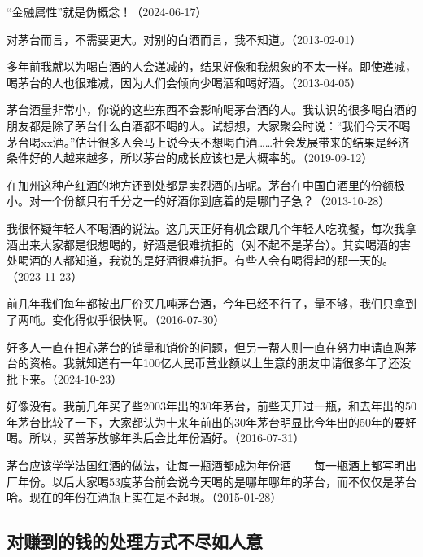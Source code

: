 “金融属性”就是伪概念！（2024-06-17）


对茅台而言，不需要更大。对别的白酒而言，我不知道。（2013-02-01）


多年前我就以为喝白酒的人会递减的，结果好像和我想象的不太一样。即使递减，喝茅台的人也很难减，因为人们会倾向少喝酒和喝好酒。（2013-04-05）

茅台酒量非常小，你说的这些东西不会影响喝茅台酒的人。我认识的很多喝白酒的朋友都是除了茅台什么白酒都不喝的人。试想想，大家聚会时说：“我们今天不喝茅台喝xx酒。”估计很多人会马上说今天不想喝白酒……社会发展带来的结果是经济条件好的人越来越多，所以茅台的成长应该也是大概率的。（2019-09-12）

在加州这种产红酒的地方还到处都是卖烈酒的店呢。茅台在中国白酒里的份额极小。对一个份额只有千分之一的好酒你到底着的是哪门子急？（2013-10-28）

我很怀疑年轻人不喝酒的说法。这几天正好有机会跟几个年轻人吃晚餐，每次我拿酒出来大家都是很想喝的，好酒是很难抗拒的（对不起不是茅台）。其实喝酒的害处喝酒的人都知道，我说的是好酒很难抗拒。有些人会有喝得起的那一天的。（2023-11-23）


前几年我们每年都按出厂价买几吨茅台酒，今年已经不行了，量不够，我们只拿到了两吨。变化得似乎很快啊。（2016-07-30）

好多人一直在担心茅台的销量和销价的问题，但另一帮人则一直在努力申请直购茅台的资格。我就知道有一年100亿人民币营业额以上生意的朋友申请很多年了还没批下来。（2024-10-23）


好像没有。我前几年买了些2003年出的30年茅台，前些天开过一瓶，和去年出的50年茅台比较了一下，大家都认为十来年前出的30年茅台明显比今年出的50年的要好喝。所以，买普茅放够年头后会比年份酒好。（2016-07-31）

茅台应该学学法国红酒的做法，让每一瓶酒都成为年份酒——每一瓶酒上都写明出厂年份。以后大家喝53度茅台前会说今天喝的是哪年哪年的茅台，而不仅仅是茅台哈。现在的年份在酒瓶上实在是不起眼。（2015-01-28）

\subsection{对赚到的钱的处理方式不尽如人意}

